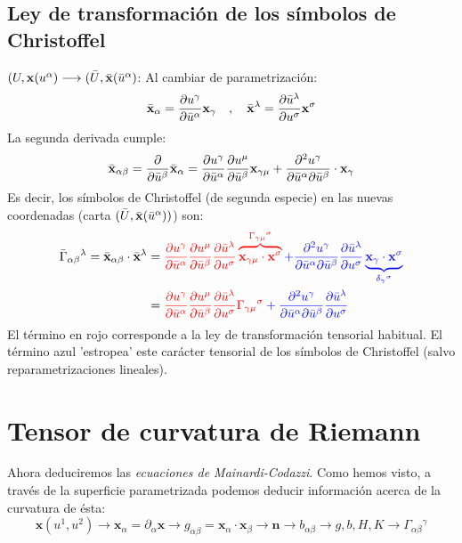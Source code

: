 \subsection{Ley de transformación de los símbolos de Christoffel}
$(U,\mathbf{x}(u^\alpha )\longrightarrow (\Bar{U},\Bar{\mathbf{x}}(\Bar{u}^\alpha )$: Al cambiar de parametrización:
$$
\Bar{\mathbf{x}}_\alpha =\pdv{u^\gamma }{\Bar{u}^\alpha }\mathbf{x}_\gamma  \quad , \quad \Bar{\mathbf{x}}^\lambda =\pdv{\bar{u}^\lambda }{u^\sigma }\mathbf{x}^\sigma 
$$
La segunda derivada cumple:
$$
\Bar{\mathbf{x}}_{\alpha \beta }=\pdv{}{\Bar{u}^\beta }\Bar{\mathbf{x}}_\alpha =\pdv{u^\gamma }{\Bar{u}^\alpha }\pdv{u^\mu }{\Bar{u}^\beta }\mathbf{x}_{\gamma \mu }+\pdv{u^\gamma }{\Bar{u}^\alpha }{\Bar{u}^\beta }\cdot \mathbf{x}_\gamma 
$$
Es decir, los símbolos de Christoffel (de segunda especie) en las nuevas coordenadas (carta $(\Bar{U},\Bar{\mathbf{x}}(\Bar{u}^\alpha ))$) son:
\begin{equation*}
    \begin{split}
        \Bar{\Gamma }_{\alpha \beta }{}^\lambda =\Bar{\mathbf{x}}_{\alpha \beta }\cdot \Bar{\mathbf{x}}^\lambda &=\color{red}\pdv{u^\gamma }{\Bar{u}^\alpha }\pdv{u^\mu }{\Bar{u}^\beta }\pdv{\Bar{u}^\lambda }{u^\sigma }\overbrace{\mathbf{x}_{\gamma \mu }\cdot \mathbf{x}^\sigma }^{\Gamma_{\gamma \mu }{}^\sigma }\color{blue} +\pdv{u^\gamma }{\Bar{u}^\alpha }{\Bar{u}^\beta }\pdv{\Bar{u}^\lambda }{u^\sigma }\underbrace{\mathbf{x}_\gamma \cdot \mathbf{x}^\sigma }_{\delta_\gamma {}^\sigma }\\
        &=\color{red}{\pdv{u^\gamma }{\Bar{u}^\alpha }\pdv{u^\mu }{\Bar{u}^\beta }\pdv{\Bar{u}^\lambda }{u^\sigma }\Gamma_{\gamma \mu }{}^\sigma }\color{blue} +\pdv{u^\gamma }{\Bar{u}^\alpha }{\Bar{u}^\beta }\pdv{\Bar{u}^\lambda }{u^\sigma }
    \end{split}
\end{equation*}
El término en rojo corresponde a la ley de transformación tensorial habitual. El término azul 'estropea' este carácter tensorial de los símbolos de Christoffel (salvo reparametrizaciones lineales).
\section{Tensor de curvatura de Riemann}
Ahora deduciremos las \emph{ecuaciones de Mainardi-Codazzi}. Como hemos visto, a través de la superficie parametrizada podemos deducir información acerca de la curvatura de ésta:
$$
\mathbf{x}(u^1,u^2)\longrightarrow \mathbf{x}_\alpha =\partial _\alpha \mathbf{x}\longrightarrow g_{\alpha \beta }=\mathbf{x}_\alpha \cdot \mathbf{x}_\beta \longrightarrow \mathbf{n}\longrightarrow b_{\alpha \beta }\longrightarrow g,b,H,K\longrightarrow \Gamma _{\alpha \beta }{}^\gamma  
$$

